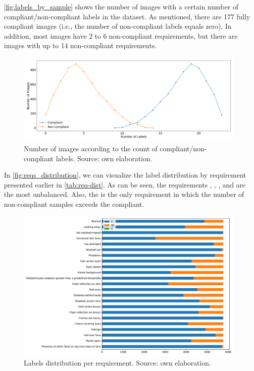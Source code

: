 \autoref{fig:labels_by_sample} shows the number of images with a certain number of compliant/non-compliant labels in the \adhoc dataset. As mentioned, there are 177 fully compliant images (i.e., the number of non-compliant labels equals zero). In addition, most images have 2 to 6 non-compliant requirements, but there are images with up to 14 non-compliant requirements.
 
\begin{figure}[tb]
\centering
\includegraphics[width=\linewidth]{images/dataset/labels_by_sample.pdf}
\caption{Number of images according to the count of compliant/non-compliant labels. Source: own elaboration.}
\label{fig:labels_by_sample}
\end{figure}
 
In \autoref{fig:reqs_distribution}, we can visualize the label distribution by requirement presented earlier in \autoref{tab:req-dist}. As can be seen, the requirements \inkmarked, \washedout, \framestooheavy, and \otherfacesortoys are the most unbalanced. Also, the \unnaturalskintone is the only requirement in which the number of non-compliant samples exceeds the compliant.
 
\begin{figure}[tb]
\centering
\includegraphics[width=\linewidth]{images/reqs/reqs_distribution.pdf}
\caption{Labels distribution per requirement. Source: own elaboration.}
\label{fig:reqs_distribution}
\end{figure}
 
